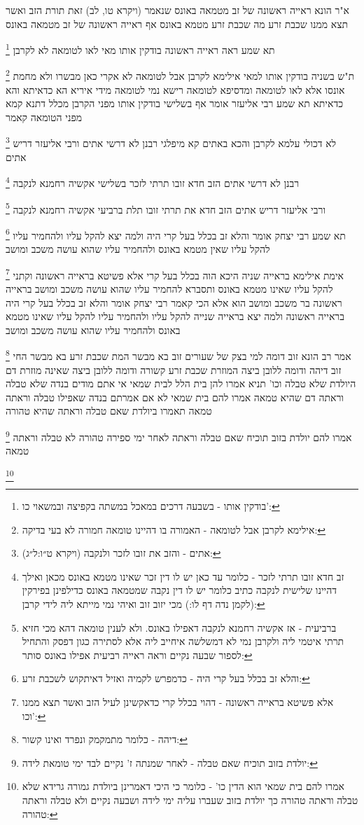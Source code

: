 \documentclass[12pt, openany]{book}
\newcommand{\footnotecomment}[1]{
	\renewcommand\thefootnote{}
	\footnote{#1}}
\newcommand{\commenta}[1]{\footnotecomment{#1}}
\begin{document}
{א"ר הונא ראייה ראשונה של זב מטמאה באונס שנאמר (ויקרא טו, לב) זאת תורת הזב ואשר תצא ממנו שכבת זרע מה שכבת זרע מטמא באונס אף ראייה ראשונה של זב מטמאה באונס 
\commenta{בודקין אותו - בשבעה דרכים במאכל במשתה בקפיצה ובמשאוי כו':}
תא שמע ראה ראייה ראשונה בודקין אותו מאי לאו לטומאה לא לקרבן 
\commenta{אילימא לקרבן אבל לטומאה - האמורה בו דהיינו טומאה חמורה לא בעי בדיקה:}
ת"ש בשניה בודקין אותו למאי אילימא לקרבן אבל לטומאה לא אקרי כאן מבשרו ולא מחמת אונסו אלא לאו לטומאה ומדסיפא לטומאה רישא נמי לטומאה 
מידי איריא הא כדאיתא והא כדאיתא 
תא שמע רבי אליעזר אומר אף בשלישי בודקין אותו מפני הקרבן מכלל דתנא קמא מפני הטומאה קאמר 
\commenta{אתים - והזב את זובו לזכר ולנקבה (ויקרא ט״ו:ל״ג):}
לא דכולי עלמא לקרבן והכא באתים קא מיפלגי רבנן לא דרשי אתים ורבי אליעזר דריש אתים 
\commenta{זב חדא זובו תרתי לזכר - כלומר עד כאן יש לו דין זכר שאינו מטמא באונס מכאן ואילך דהיינו שלישית לנקבה כתיב כלומר יש לו דין נקבה שמטמאה באונס כדילפינן בפירקין (לקמן נדה דף לו:) מכי יזוב זוב ואיהי נמי מייתא ליה לידי קרבן:}
רבנן לא דרשי אתים הזב חדא זובו תרתי לזכר בשלישי אקשיה רחמנא לנקבה 
\commenta{ברביעית - אז אקשיה רחמנא לנקבה דאפילו באונס. ולא לענין טומאה דהא מכי חזיא תרתי איטמי ליה ולקרבן נמי לא דמשלשה איחייב ליה אלא לסתירה כגון דפסק והתחיל לספור שבעה נקיים וראה ראייה רביעית אפילו באונס סותר:}
ורבי אליעזר דריש אתים הזב חדא את תרתי זובו תלת ברביעי אקשיה רחמנא לנקבה 
\commenta{והלא זב בכלל בעל קרי היה - כדמפרש לקמיה ואזיל דאיתקוש לשכבת זרע:}
תא שמע רבי יצחק אומר והלא זב בכלל בעל קרי היה ולמה יצא להקל עליו ולהחמיר עליו להקל עליו שאין מטמא באונס ולהחמיר עליו
שהוא עושה משכב ומושב 
\commenta{אלא פשיטא בראייה ראשונה - דהוי בכלל קרי כדאקשינן לעיל הזב ואשר תצא ממנו וכו':}
אימת אילימא בראייה שניה היכא הוה בכלל בעל קרי אלא פשיטא בראייה ראשונה וקתני להקל עליו שאינו מטמא באונס 
ותסברא להחמיר עליו שהוא עושה משכב ומושב בראייה ראשונה בר משכב ומושב הוא 
אלא הכי קאמר רבי יצחק אומר והלא זב בכלל בעל קרי היה בראייה ראשונה ולמה יצא בראייה שנייה להקל עליו ולהחמיר עליו להקל עליו שאינו מטמא באונס ולהחמיר עליו שהוא עושה משכב ומושב 
\commenta{דיהה - כלומר מתמקמק ונפרד ואינו קשור:}
אמר רב הונא זוב דומה למי בצק של שעורים זוב בא מבשר המת שכבת זרע בא מבשר החי זוב דיהה ודומה ללובן ביצה המוזרת שכבת זרע קשורה ודומה ללובן ביצה שאינה מוזרת
דם היולדת שלא טבלה וכו'
תניא אמרו להן בית הלל לבית שמאי אי אתם מודים בנדה שלא טבלה וראתה דם שהיא טמאה אמרו להם בית שמאי לא אם אמרתם בנדה שאפילו טבלה וראתה טמאה תאמרו ביולדת שאם טבלה וראתה שהיא טהורה 
\commenta{יולדת בזוב תוכיח שאם טבלה - לאחר שמנתה ז' נקיים לבד ימי טומאת לידה:}
אמרו להם יולדת בזוב תוכיח שאם טבלה וראתה לאחר ימי ספירה טהורה לא טבלה וראתה טמאה 
\commenta{אמרו להם בית שמאי הוא הדין כו' - כלומר כי היכי דאמרינן ביולדת גמורה גרידא שלא טבלה וראתה טהורה כך יולדת בזוב שעברו עליה ימי לידה ושבעה נקיים ולא טבלה וראתה טהורה:}
}
\end{document}
